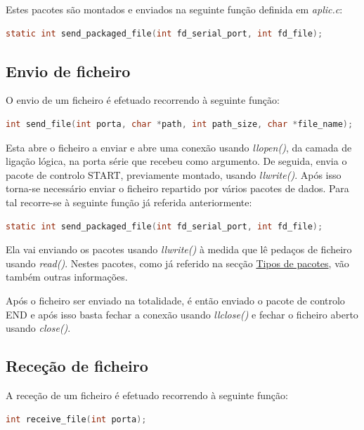 \documentclass[a4paper,11pt,portuguese]{article}
\begin{document}
    \hfill \break
    \noindent Estes pacotes são montados e enviados na seguinte função definida em \textit{aplic.c}:

\begin{lstlisting}[language=C]
static int send_packaged_file(int fd_serial_port, int fd_file);
\end{lstlisting}


    \subsection{Envio de ficheiro}
    O envio de um ficheiro é efetuado recorrendo à seguinte função:

\begin{lstlisting}[language=C]
int send_file(int porta, char *path, int path_size, char *file_name);
\end{lstlisting}

    \noindent Esta abre o ficheiro a enviar e abre uma conexão usando \textit{llopen()}, da camada
    de ligação lógica, na porta série que recebeu como argumento. De seguida, envia o pacote de controlo
    START, previamente montado, usando \textit{llwrite()}. Após isso torna-se necessário enviar o
    ficheiro repartido por vários pacotes de dados. Para tal recorre-se à seguinte função já referida
    anteriormente:

\begin{lstlisting}[language=C]
static int send_packaged_file(int fd_serial_port, int fd_file);
\end{lstlisting}

    \noindent Ela vai enviando os pacotes usando \textit{llwrite()} à medida que lê pedaços de ficheiro usando
    \textit{read()}. Nestes pacotes, como já referido na secção \hyperref[pacotesdados]{Tipos de pacotes}, 
    vão também outras informações. \par
    
    Após o ficheiro ser enviado na totalidade, é então enviado o pacote de controlo END e após isso basta fechar 
    a conexão usando \textit{llclose()} e fechar o ficheiro aberto usando \textit{close()}.

    
    \subsection{Receção de ficheiro}
    A receção de um ficheiro é efetuado recorrendo à seguinte função:
    
\begin{lstlisting}[language=C]
int receive_file(int porta);
\end{lstlisting}
    
\end{document}
